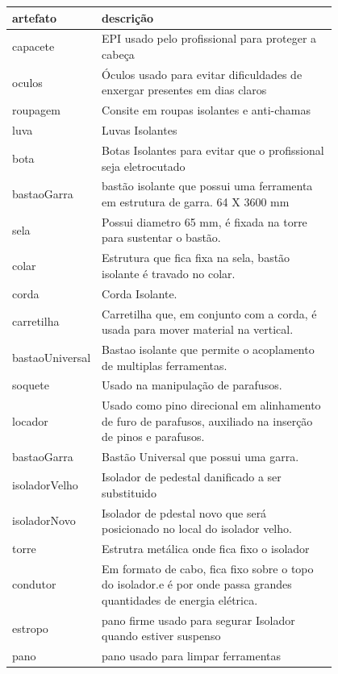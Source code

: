 \documentclass[12pt]{article}
\begin{document}
\begin{table}[H]
\centering
\begin{tabular}{|l|p{0.8\linewidth}|}
\hline
\textbf{artefato} & \textbf{descrição} \\ \hline
capacete & EPI usado pelo profissional para proteger a cabeça \\ \hline
oculos & Óculos usado para evitar dificuldades de enxergar presentes em dias claros \\ \hline
roupagem & Consite em roupas isolantes e anti-chamas \\ \hline
luva & Luvas Isolantes \\ \hline
bota & Botas Isolantes para evitar que o profissional seja eletrocutado \\ \hline
bastaoGarra & bastão isolante que possui uma ferramenta em estrutura de garra. 64 X 3600 mm \\ \hline
sela & Possui diametro 65 mm, é fixada na torre para sustentar o bastão. \\ \hline
colar & Estrutura que fica fixa na sela, bastão isolante é travado no colar. \\ \hline
corda & Corda Isolante. \\ \hline
carretilha & Carretilha que, em conjunto com a corda, é usada para mover material na vertical. \\ \hline
bastaoUniversal & Bastao isolante que permite o acoplamento de multiplas ferramentas. \\ \hline
soquete & Usado na manipulação de parafusos. \\ \hline
locador & Usado como pino direcional em alinhamento de furo de parafusos, auxiliado na inserção de pinos e parafusos. \\ \hline
bastaoGarra & Bastão Universal que possui uma garra. \\ \hline
isoladorVelho & Isolador de pedestal danificado a ser substituido \\ \hline
isoladorNovo & Isolador de pdestal novo que será posicionado no local do isolador velho. \\ \hline
torre & Estrutra metálica onde fica fixo o isolador \\ \hline
condutor & Em formato de cabo, fica fixo sobre o topo do isolador.e é por onde passa grandes quantidades de energia elétrica. \\ \hline
estropo & pano firme usado para segurar Isolador quando estiver suspenso \\ \hline
pano & pano usado para limpar ferramentas \\ \hline

\end{tabular}
\end{table}
\end{document}
